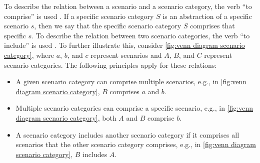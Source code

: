 \documentclass[twoside,twocolumn,9pt]{extarticle}
\theoremstyle{plain}
\newcommand{\scenario}{s}
\newcommand{\scenarioa}{a}
\newcommand{\scenariob}{b}
\newcommand{\scenarioc}{c}
\newcommand{\scenariocategory}{S}
\newcommand{\scenariocategorya}{A}
\newcommand{\scenariocategoryb}{B}
\newcommand{\scenariocategoryc}{C}
\begin{document}
To describe the relation between a scenario and a scenario category, the verb ``to comprise'' is used \autocite{degelder2020ontology}.
If a specific scenario category $\scenariocategory$ is an abstraction of a specific scenario $\scenario$, then we say that the specific scenario category $\scenariocategory$ comprises that specific $\scenario$. 
To describe the relation between two scenario categories, the verb ``to include'' is used \autocite{degelder2020ontology}. 
To further illustrate this, consider \cref{fig:venn diagram scenario category}, where $\scenarioa$, $\scenariob$, and $\scenarioc$ represent scenarios and $\scenariocategorya$, $\scenariocategoryb$, and $\scenariocategoryc$ represent scenario categories.
The following principles apply for these relations:
\begin{itemize}
	\item A given scenario category can comprise multiple scenarios, e.g., in \cref{fig:venn diagram scenario category}, $\scenariocategoryb$ comprises $\scenarioa$ and $\scenariob$.
	\item Multiple scenario categories can comprise a specific scenario, e.g., in \cref{fig:venn diagram scenario category}, both $\scenariocategorya$ and $\scenariocategoryb$ comprise $\scenariob$. 
	\item A scenario category includes another scenario category if it comprises all scenarios that the other scenario category comprises, e.g., in \cref{fig:venn diagram scenario category}, $\scenariocategoryb$ includes $\scenariocategorya$.
\end{itemize}
\end{document}
